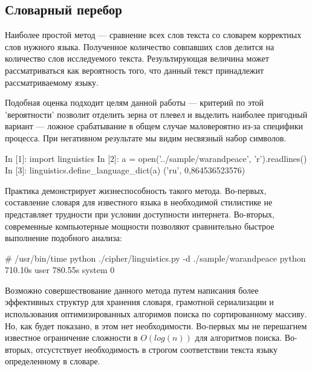 \subsection{Словарный перебор}
Наиболее простой метод — сравнение всех слов текста со словарем 
корректных слов нужного языка. Полученное количество совпавших слов
делится на количество слов исследуемого текста. Результирующая 
величина может рассматриваться как вероятность того, что данный 
текст принадлежит рассматриваемому языку.

Подобная оценка подходит целям данной работы — критерий по 
этой 'вероятности' позволит отделить зерна от плевел и выделить 
наиболее пригодный вариант — ложное срабатывание в общем случае 
маловероятно из-за специфики процесса. При негативном результате мы видим 
несвязный набор символов.

\begin{listing}[1]{1}
In [1]: import linguistics
In [2]: a = open('../sample/warandpeace', 'r').readlines()
In [3]: linguistics.define_language_dict(a)
('ru', 0,864536523576)
\end{listing}

Практика демонстрирует жизнеспособность такого метода. Во-первых, 
составление 
словаря для известного языка в необходимой стилистике не представляет 
трудности при условии доступности интернета. Во-вторых, современные 
компьютерные мощности позволяют сравнительно быстрое выполнение 
подобного анализа:

\begin{listing}[1]{1}
# /usr/bin/time python ./cipher/linguistics.py -d ./sample/warandpeace 
python  710.10s user 780.55s system 0%
\end{listing}

Возможно совершествование данного метода путем написания более 
эффективных структур для хранения словаря, грамотной сериализации и 
использования оптимизированных алгоримов поиска по сортированному 
массиву. Но, как будет показано, в этом нет необходимости.
Во-первых мы не перешагнем известное ограничение сложности в 
$O(log(n))$ для алгоритмов поиска. Во-вторых, отсустствует необходимость 
в строгом соответствии текста языку определенному в словаре.

